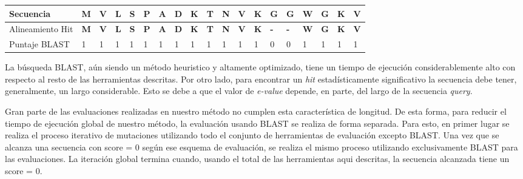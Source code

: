 \noindent
\begin{tabular}{lllllllllllllllllll} 
\hline
Secuencia 		& \textbf{M} & \textbf{V} & \textbf{L} & \textbf{S} & \textbf{P} & \textbf{A} & \textbf{D} & \textbf{K} & \textbf{T} & \textbf{N} & \textbf{V} & \textbf{K} & \textbf{G} & \textbf{G} & \textbf{W} & \textbf{G} & \textbf{K} & \textbf{V}\\ \hline
Alineamiento Hit	& \textbf{M} & \textbf{V} & \textbf{L} & \textbf{S} & \textbf{P} & \textbf{A} & \textbf{D} & \textbf{K} & \textbf{T} & \textbf{N} & \textbf{V} & \textbf{K} & \textbf{-} & \textbf{-} & \textbf{W} & \textbf{G} & \textbf{K} & \textbf{V}\\ \hline
Puntaje BLAST 		& 1 & 1 & 1 & 1 & 1 & 1 & 1 & 1 & 1 & 1 & 1 & 1 & 0 & 0 & 1 & 1 & 1 & 1 \\ \hline
\end{tabular}

\vspace{0.5cm}

La búsqueda BLAST, aún siendo un método heuristico y altamente optimizado, tiene un tiempo de ejecución considerablemente alto con respecto al resto de las herramientas descritas.
Por otro lado, para encontrar un \textit{hit} estadísticamente significativo la secuencia debe tener, generalmente, un largo considerable.
Esto se debe a que el valor de \textit{e-value} depende, en parte, del largo de la secuencia \textit{query}. 

Gran parte de las evaluaciones realizadas en nuestro método no cumplen esta característica de longitud. 
De esta forma, para reducir el tiempo de ejecución global de nuestro método, la evaluación usando BLAST se realiza de forma separada. 
Para esto, en primer lugar se realiza el proceso iterativo de mutaciones utilizando todo el conjunto de herramientas de evaluación excepto BLAST.
Una vez que se alcanza una secuencia con score = 0 según ese esquema de evaluación, se realiza el mismo proceso utilizando exclusivamente BLAST para las evaluaciones.
La iteración global termina cuando, usando el total de las herramientas aqui descritas, la secuencia alcanzada tiene un score = 0. 










